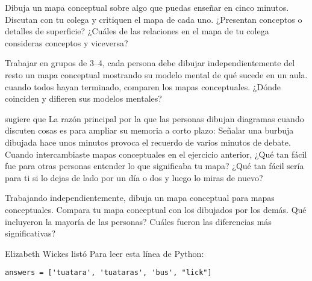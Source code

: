 

Dibuja un mapa conceptual sobre algo que puedas enseñar en cinco minutos.
Discutan con tu colega y critiquen el mapa de cada uno.
¿Presentan conceptos o detalles de superficie?
¿Cuáles de las relaciones en el mapa de tu colega consideras conceptos y viceversa?


Trabajar en grupos de 3--4,
cada persona debe dibujar independientemente del resto un mapa conceptual mostrando su modelo mental de qué sucede en un aula.
cuando todos hayan terminado,
comparen los mapas conceptuales.
¿Dónde coinciden y difieren sus modelos mentales?


\cite{Cher2007} sugiere que
La razón principal por la que las personas dibujan diagramas cuando discuten cosas
es para ampliar su memoria a corto plazo:
Señalar una burbuja dibujada hace unos minutos provoca el recuerdo de varios minutos de debate.
Cuando intercambiaste mapas conceptuales en el ejercicio anterior,
¿Qué tan fácil fue para otras personas entender lo que significaba tu mapa?
¿Qué tan fácil sería para ti si lo dejas de lado por un día o dos y luego lo miras de nuevo?


Trabajando independientemente,
dibuja un mapa conceptual para mapas conceptuales.
Compara tu mapa conceptual con los dibujados por los demás.
Qué incluyeron la mayoría de las personas?
Cuáles fueron las diferencias más significativas?


Elizabeth Wickes listó
Para leer esta línea de Python:

\begin{verbatim}
answers = ['tuatara', 'tuataras', 'bus', "lick"]
\end{verbatim}

